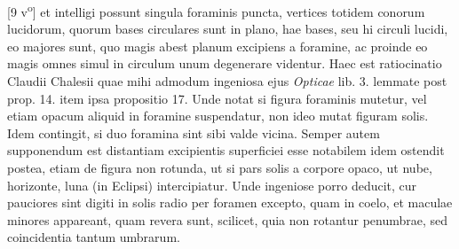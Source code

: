 [9 v\textsuperscript{o}] et intelligi possunt singula foraminis puncta, vertices totidem conorum lucidorum, quorum bases circulares sunt in plano, hae bases, seu hi circuli lucidi, eo majores sunt, quo magis abest planum excipiens a foramine, ac proinde eo magis omnes simul in circulum unum degenerare videntur. \pend \pstart Haec est ratiocinatio Claudii Chalesii\protect{} quae mihi admodum ingeniosa  ejus \textit{Opticae} lib. 3. lemmate post prop. 14. item ipsa propositio 17. Unde notat si figura foraminis mutetur, vel etiam opacum aliquid in foramine suspendatur, non ideo mutat figuram solis. Idem contingit, si duo foramina sint sibi valde vicina. Semper autem supponendum est distantiam excipientis superficiei esse notabilem idem ostendit postea, etiam de figura non rotunda, ut si pars solis a corpore opaco, ut nube, horizonte, luna (in Eclipsi\protect{}) intercipiatur. Unde ingeniose porro deducit, cur pauciores sint digiti  in solis radio per foramen excepto, quam in coelo, et maculae minores appareant, quam revera sunt, scilicet, quia non rotantur penumbrae, sed coincidentia tantum umbrarum. \pend 